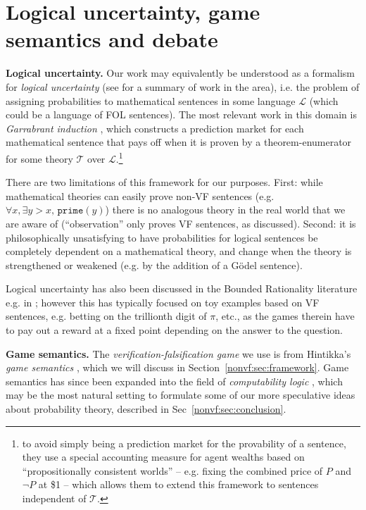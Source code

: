 \section{Logical uncertainty, game semantics and debate}\label{litrev:sec:logic}
\label{nonvf:sec:related}
\textbf{Logical uncertainty.} Our work may equivalently be understood as a formalism for \emph{logical uncertainty} (see \citep{halpernReasoningUncertaintySecond2017} for a summary of work in the area), i.e. the problem of assigning probabilities to mathematical sentences in some language $\mathcal{L}$ (which could be a language of FOL sentences). The most relevant work in this domain is \emph{Garrabrant induction} \citep{garrabrantLogicalInduction2020}, which constructs a prediction market for each mathematical sentence that pays off when it is proven by a theorem-enumerator for some theory $\mathcal{T}$ over $\mathcal{L}$.\footnote{to avoid simply being a prediction market for the provability of a sentence, they use a special accounting measure for agent wealths based on ``propositionally consistent worlds'' -- e.g. fixing the combined price of $P$ and $\lnot P$ at \$1 -- which allows them to extend this framework to sentences independent of $\mathcal{T}$.} 

There are two limitations of this framework for our purposes. First: while mathematical theories can easily prove non-VF sentences (e.g. $\forall x,\exists y>x,\,\texttt{prime}(y)$) there is no analogous theory in the real world that we are aware of (``observation'' only proves VF sentences, as discussed). Second: it is philosophically unsatisfying to have probabilities for logical sentences be completely dependent on a mathematical theory, and change when the theory is strengthened or weakened (e.g. by the addition of a G\"odel sentence).

Logical uncertainty has also been discussed in the Bounded Rationality literature e.g. in \citet{halpernAlgorithmicRationalityGame2014,halpernDontWantThink2011,oesterheldTheoryBoundedInductive2023}; however this has typically focused on toy examples based on VF sentences, e.g. betting on the trillionth digit of $\pi$, etc., %
as the games therein have to pay out a reward at a fixed point depending on the answer to the question.

\textbf{Game semantics.} The \emph{verification-falsification game} we use is from Hintikka's \emph{game semantics} \citep{hintikkaGameTheoreticSemantics1997}, which we will discuss in Section~\ref{nonvf:sec:framework}. Game semantics has since been expanded into the field of \emph{computability logic} \citep{japaridzeBeginningWasGame2009,japaridzeSurveyComputabilityLogic2015}, which may be the most natural setting to formulate some of our more speculative ideas about probability theory, described in Sec~\ref{nonvf:sec:conclusion}.

